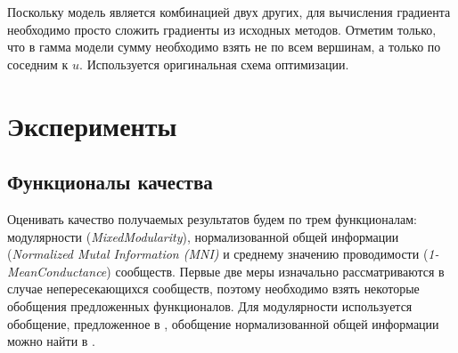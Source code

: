 \documentclass{ITaSconf}
\begin{document}
	Поскольку модель является комбинацией двух других, для вычисления градиента необходимо просто сложить градиенты из исходных методов.
	Отметим только, что в гамма модели сумму необходимо взять не по всем вершинам, а только по соседним к $u$.
	Используется оригинальная схема оптимизации.
	
	\section{Эксперименты}
	
	\subsection{Функционалы качества}
	Оценивать качество получаемых результатов будем по трем функционалам: модулярности (\textit{MixedModularity}), нормализованной общей информации (\textit{Normalized Mutal Information (MNI)} и среднему значению проводимости (\textit{1-MeanConductance}) сообществ.
	Первые две меры изначально рассматриваются в случае непересекающихся сообществ, поэтому необходимо взять некоторые обобщения предложенных функционалов.
	Для модулярности используется обобщение, предложенное в \cite{xie2013overlapping}, обобщение нормализованной общей информации можно найти в \cite{lancichinetti2009detecting}.
	
\end{document}
